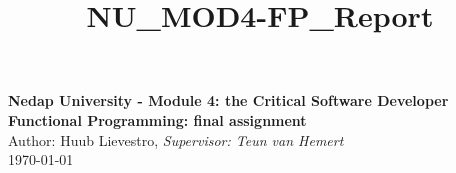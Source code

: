 \documentclass[a4paper, 11pt]{article}
\title{NU_MOD4-FP_Report}
\begin{document}
\begin{center}
{\bf \Large Nedap University - Module 4: the Critical Software Developer \\}
{\bf \Large  Functional Programming: final assignment}\\
\vspace{0.2cm}
{\large{Author: Huub Lievestro}, \textit{Supervisor: Teun van Hemert}}\\
\vspace{0.1cm}
\today
\end{center}

\end{document}
